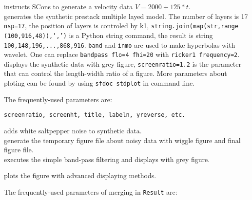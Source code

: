 
%
instructs SCons to generate a velocity data \texttt{$V=2000+125*t$}. \\


%
generates the synthetic prestack multiple layed model. The number of layers 
is 17 \texttt{nsp=17}, the position of layers is controled by k1, 
\texttt{string.join(map(str,range (100,916,48)),',')} is a Python string 
command, the result is string
\texttt{100,148,196,...,868,916}. \texttt{band} and
\texttt{inmo} are used to make hyperbolas with wavelet. One can replace 
\texttt{bandpass flo=4 fhi=20} with \texttt{ricker1 frequency=2}.\\


%
displays the synthetic data with grey figure, \texttt{screenratio=1.2} is 
the parameter that can control the length-width ratio of a figure. More
parameters about ploting can be found by using \texttt{sfdoc stdplot} in
command line.

The frequently-used parameters are:

\texttt{screenratio, screenht, title, labeln, yreverse, etc.}



%
adds white saltpepper noise to synthetic data. \\


%
generate the temporary figure file about noisy data with wiggle
figure and final figure file.\\


%
executes the simple band-pass filtering and displays with grey figure.\\



%
plots the figure with advanced displaying methods. 

The frequently-used parameters of merging in \texttt{Result} are:

